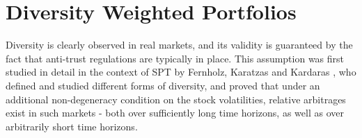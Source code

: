 \documentclass[british]{amsart}
\numberwithin{equation}{section}
\numberwithin{figure}{section}
\theoremstyle{plain}
\theoremstyle{definition}
\theoremstyle{plain}
\theoremstyle{plain}
\theoremstyle{plain}
\theoremstyle{remark}
\theoremstyle{plain}
\begin{document}
\section{Diversity Weighted Portfolios}

Diversity is clearly observed in real markets, and its validity is guaranteed by 
the fact that anti-trust regulations are typically in place. This assumption was 
first studied in detail in the context of SPT by Fernholz, Karatzas and Kardaras 
\cite{fernholz2005}, who defined and studied different forms of diversity, and 
proved that under an additional non-degeneracy condition on the stock 
volatilities, relative arbitrages exist in such markets - both over sufficiently 
long time horizons, as well as over arbitrarily short time horizons.

\printbibliography
\end{document}
